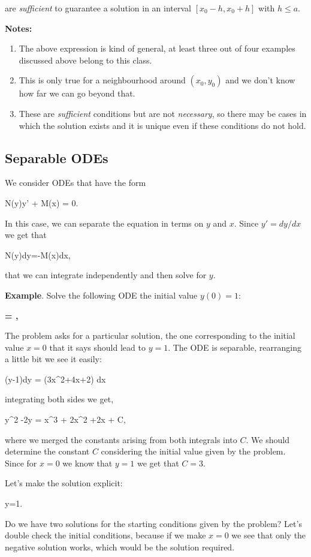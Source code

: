 are {\em sufficient} to guarantee a solution in an interval $[x_0-h,x_0+h]$ with $h\leq a$.

{\bf Notes:}
\begin{enumerate}
	\item  The above expression is kind of general, at least three out of four examples discussed above belong to this class.
	\item This is only true for a neighbourhood around $(x_0,y_0)$ and we don't know how far we can go beyond that.
	\item These are {\em sufficient} conditions but are not {\em necessary}, so there may be cases in which the solution exists and it is unique even if these conditions do not hold.
\end{enumerate}


\subsection{Separable ODEs}

We consider ODEs that have the form

\bnn N(y)y' + M(x) = 0. \enn

In this case, we can separate the equation in terms on $y$ and $x$. Since $y'=dy/dx$ we get that

\bnn N(y)dy=-M(x)dx, \enn

that we can integrate independently and then solve for $y$.

{\bf Example}. Solve the following ODE the initial value $y(0)=1$: 

{\bf \bnn {} = , \enn }

The problem asks for a particular solution, the one corresponding to the initial value $x=0$ that it says should lead to $y=1$. The ODE is separable, rearranging a little bit we see it easily:

(y-1)dy = (3x^2+4x+2) dx \enn

integrating both sides we get,

\bnn y^2 -2y = x^3 + 2x^2 +2x + C, \enn

where we merged the constants arising from both integrals into $C$. We should determine the
constant $C$ considering the initial value given by the problem. Since for $x=0$ we know that $y=1$ we get that $C=3$.

Let's make the solution explicit:

\bnn y=1\pm{}. \enn

Do we have two solutions for the starting conditions given by the problem? Let's double check the initial conditions, because if we make $x=0$ we see that only the negative solution works, which would be the solution required.

